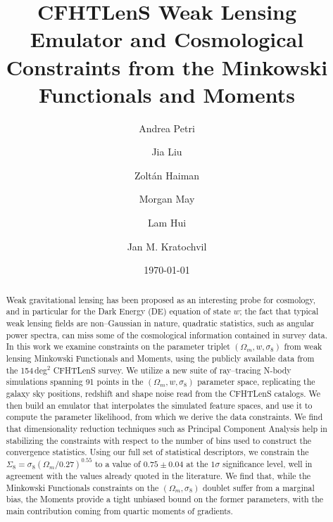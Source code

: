 \documentclass[reprint,aps,prd,superscriptaddress,showkeys,showpacs]{revtex4-1}
\begin{document}
\title{CFHTLenS Weak Lensing Emulator and Cosmological Constraints from the Minkowski Functionals and Moments}

\author{Andrea Petri}

\author{Jia Liu}

\author{Zolt\'an Haiman}

\author{Morgan May}

\author{Lam Hui}

\author{Jan M. Kratochvil}

\date{\today}

\label{firstpage}

\begin{abstract}
Weak gravitational lensing has been proposed as an interesting probe for cosmology, and in particular for the Dark Energy (DE) equation of state $w$; the fact that typical weak lensing fields are non--Gaussian in nature, quadratic statistics, such as angular power spectra, can miss some of the cosmological information contained in survey data. In this work we examine constraints on the parameter triplet $(\Omega_m,w,\sigma_8)$ from weak lensing Minkowski Functionals and Moments, using the publicly available data from the 154\,deg$^2$ CFHTLenS survey. We utilize a new suite of ray--tracing N-body simulations spanning 91 points in the $(\Omega_m,w,\sigma_8)$ parameter space, replicating the galaxy sky positions, redshift and shape noise read from the CFHTLenS catalogs. We then build an emulator that interpolates the simulated feature spaces, and use it to compute the parameter likelihood, from which we derive the data constraints. We find that dimensionality reduction techniques such as Principal Component Analysis help in stabilizing the constraints with respect to the number of bins used to construct the convergence statistics. Using our full set of statistical descriptors, we constrain the $\Sigma_8=\sigma_8(\Omega_m/0.27)^{0.55}$ to a value of $0.75\pm0.04$ at the $1\sigma$ significance level, well in agreement with the values already quoted in the literature. We find that, while the Minkowski Functionals constraints on the $(\Omega_m,\sigma_8)$ doublet suffer from a marginal bias, the Moments provide a tight unbiased bound on the former parameters, with the main contribution coming from quartic moments of gradients.  

\end{abstract}
\end{document}
